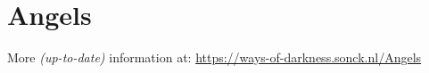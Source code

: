 \section{Angels}
More \textit{(up-to-date)} information at: \url{https://ways-of-darkness.sonck.nl/Angels}


